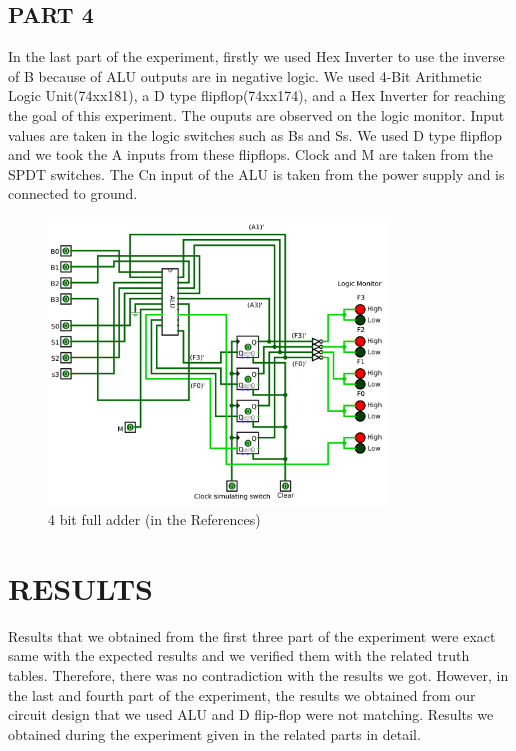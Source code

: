 \documentclass[pdftex,12pt,a4paper]{article}
\begin{document}
\subsection{PART 4}
In the last part of the experiment, firstly we used Hex Inverter to use the inverse of B because of ALU outputs are in negative logic. We used 4-Bit Arithmetic Logic Unit(74xx181), a D type flipflop(74xx174), and a Hex Inverter for reaching the goal of this experiment. The ouputs are observed on the logic monitor. Input values are taken in the logic switches such as Bs and Ss. We used D type flipflop and we took the A inputs from these flipflops. Clock and M are taken from the SPDT switches. The Cn input of the ALU is taken from the power supply and is connected to ground. 

\begin{figure}[h]
    	\centering
    	\includegraphics[width=0.8\textwidth]{part4.png}	
    	\caption{4 bit full adder (in the References)}
    	\label{fig:4-bit_full_adder}
    \end{figure}

\section{RESULTS}
Results that we obtained from the first three part of the experiment were exact same with the expected results and we verified them with the related truth tables. Therefore, there was no contradiction with the results we got. However, in the last and fourth part of the experiment, the results we obtained from our circuit design that we used ALU and D flip-flop were not matching. Results we obtained during the experiment given in the related parts in detail.
\end{document}
